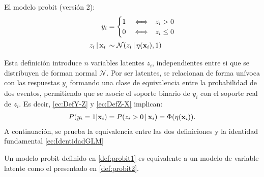 \documentclass[../Main/Main.tex]{subfiles}
\begin{document}
\begin{definition} El modelo probit (versión 2): \label{def:probit2}
\begin{align}
y_i &= 
	\begin{cases}
		1 & \iff \enspace z_i > 0 \\									0 & \iff \enspace z_i \leq 0
	\end{cases} \label{ec:DefY-Z} \\[2pt]
z_i\,|\,\mathbf{x}_i\, &\sim \mathcal{N}(z_i\,|\,\eta(\mathbf{x}_i),1) \label{ec:DefZ-X}
\end{align}
\end{definition}
Esta definición introduce $n$ variables latentes $z_i$, independientes entre si que se distribuyen de forman normal $\mathcal{N}$. Por ser latentes, se relacionan de forma unívoca con las respuestas $y_i$ formando una clase de equivalencia entre la probabilidad de dos eventos, permitiendo que se asocie el soporte binario de $y_i$ con el soporte real de $z_i$. Es decir, \eqref{ec:DefY-Z} y \eqref{ec:DefZ-X} implican:
\begin{align}
	P(y_i = 1 |\mathbf{x}_i) = P(z_i > 0 \,|\, \mathbf{x}_i) = \Phi(\eta(\mathbf{x}_i)). 	\label{ec:IdentidadGLM}
\end{align}
A continuación, se prueba la equivalencia entre las dos definiciones y la identidad fundamental \eqref{ec:IdentidadGLM}\\

\begin{theorem} \label{teo:Defs}
Un modelo probit definido en \ref{def:probit1} es equivalente a un modelo de variable latente como el presentado en \ref{def:probit2}.
\end{theorem}
\end{document}
